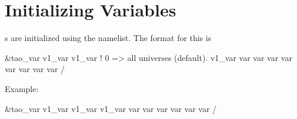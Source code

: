 \section{Initializing Variables}
\label{s:init_var} 

s are initialized using the  namelist. The
format for this is
\begin{example}
  \&tao_var
    v1_var%
    v1_var%
                                                !   0 => all universes (default).
    v1_var%
    var%
    var%
    var%
    var%
    var%
    var%
    var%
    var%
  /
\end{example}
Example:
\begin{example}
  \&tao_var
    v1_var%
    v1_var%
    v1_var%
    var%
    var%
    var%
    var%
    var%
    var%
  /
\end{example}

